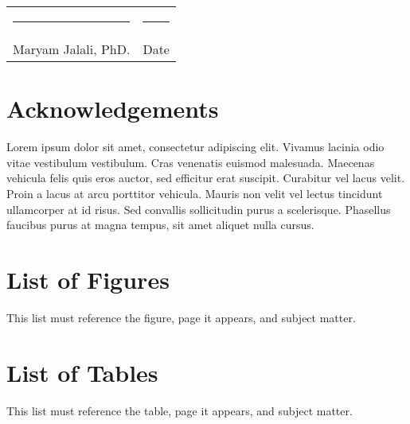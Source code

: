 \documentclass[12pt]{report} %
\begin{document}
        \begin{center}
            \begin{tabular}{p{3in} p{1in}}
                \rule{3in}{0.4pt} & \rule{1in}{0.4pt}\\
                Maryam Jalali, PhD. & Date \\
            \end{tabular}
        \end{center}

    \newpage

    \chapter*{\normalfont Acknowledgements}\label{chapter:Acknowledgements}
    \vspace{3in}
        \begin{center}
            Lorem ipsum dolor sit amet, consectetur adipiscing elit.
            Vivamus lacinia odio vitae vestibulum vestibulum.
            Cras venenatis euismod malesuada.
            Maecenas vehicula felis quis eros auctor, sed efficitur erat suscipit.
            Curabitur vel lacus velit. Proin a lacus at arcu porttitor vehicula.
            Mauris non velit vel lectus tincidunt ullamcorper at id risus.
            Sed convallis sollicitudin purus a scelerisque.
            Phasellus faucibus purus at magna tempus, sit amet aliquet nulla cursus.
        \end{center}
    

    \newpage

    \tableofcontents

    \newpage


    \chapter*{\normalfont List of Figures}\label{chapter:ListFigures}
    \begin{center}
        This list must reference the figure, page it appears, and subject matter.
    \end{center}
    
    \newpage

    \chapter*{\normalfont List of Tables}\label{chapter:ListTables}
    \begin{center}
        This list must reference the table, page it appears, and subject matter.
    \end{center}
    
\end{document}

